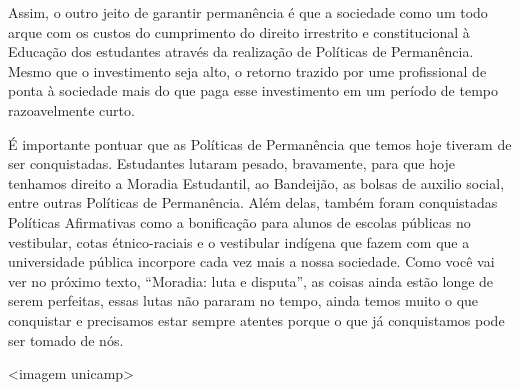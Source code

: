 Assim, o outro jeito de garantir permanência é que a sociedade como um todo arque
com os custos do cumprimento do direito irrestrito e constitucional à Educação dos
estudantes através da realização de Políticas de Permanência. Mesmo que o
investimento seja alto, o retorno trazido por ume profissional de ponta à sociedade mais
do que paga esse investimento em um período de tempo razoavelmente curto.

É importante pontuar que as Políticas de Permanência que temos hoje tiveram de ser
conquistadas. Estudantes lutaram pesado, bravamente, para que hoje tenhamos direito a
Moradia Estudantil, ao Bandeijão, as bolsas de auxilio social, entre outras Políticas de
Permanência. Além delas, também foram conquistadas Políticas Afirmativas como a
bonificação para alunos de escolas públicas no vestibular, cotas étnico-raciais e o
vestibular indígena que fazem com que a universidade pública incorpore cada vez mais
a nossa sociedade. Como você vai ver no próximo texto, “Moradia: luta e disputa”, as
coisas ainda estão longe de serem perfeitas, essas lutas não pararam no tempo, ainda
temos muito o que conquistar e precisamos estar sempre atentes porque o que já
conquistamos pode ser tomado de nós.

<imagem unicamp>